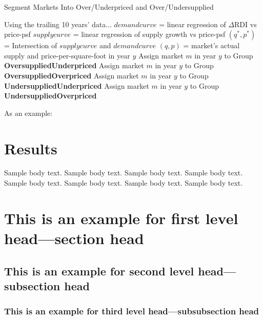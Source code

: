 \documentclass[sn-mathphys-num]{sn-jnl}%
\theoremstyle{thmstyleone}%
\theoremstyle{thmstyletwo}%
\theoremstyle{thmstylethree}%
\begin{document}
\begin{algorithm}
	\caption{Segment Markets Into Over/Underpriced and Over/Undersupplied}\label{alg:market_segmentation}
	\begin{algorithmic}[1]
		        \State Using the trailing 10 years' data...
		        \State $demandcurve$ = linear regression of  $\Delta\text{RDI}$  vs price-psf
		        \State $supplycurve$ = linear regression of supply growth vs price-psf
		        \State $(q^*, p^*)$ = Intersection of $supplycurve$ and $demandcurve$
		        \State $(q, p)$ = market's actual supply and price-per-square-foot in year $y$
		                \State Assign market $m$ in year $y$ to Group \textbf{OversuppliedUnderpriced}
		            \Else
		                \State Assign market $m$ in year $y$ to Group \textbf{OversuppliedOverpriced}
		            \EndIf
		        \Else
		                \State Assign market $m$ in year $y$ to Group \textbf{UndersuppliedUnderpriced}
		            \Else
		                \State Assign market $m$ in year $y$ to Group \textbf{UndersuppliedOverpriced}
		            \EndIf
		        \EndIf
		    \EndFor
		\EndFor
	\end{algorithmic}
\end{algorithm}


As an example:




\section{Results}\label{sec2}

Sample body text. Sample body text. Sample body text. Sample body text. Sample body text. Sample body text. Sample body text. Sample body text.

\section{This is an example for first level head---section head}\label{sec3}

\subsection{This is an example for second level head---subsection head}\label{subsec2}

\subsubsection{This is an example for third level head---subsubsection head}\label{subsubsec2}
\end{document}
